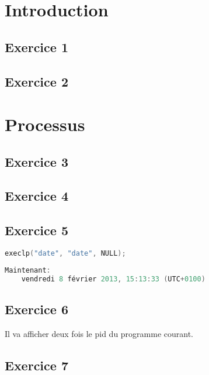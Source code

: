 \documentclass[12pt,a4paper,openany]{book}
\begin{document}
	\setcounter{tocdepth}{2}
	\setcounter{secnumdepth}{3}
	\maketitle
	\tableofcontents
	\chapter{Introduction}
		\section{Exercice 1}
		
		
		\section{Exercice 2}
		
		
	\chapter{Processus}
		\section{Exercice 3}
		
		\section{Exercice 4}
		
		\section{Exercice 5}
\begin{lstlisting}[language=C, numbers=none]
execlp("date", "date", NULL);
\end{lstlisting}
\begin{lstlisting}[language=C, numbers=none]
	Maintenant: 
	vendredi 8 février 2013, 15:13:33 (UTC+0100)
\end{lstlisting}
		\section{Exercice 6}
		Il va afficher deux fois le pid du programme courant.
		\section{Exercice 7}
		
\end{document}
